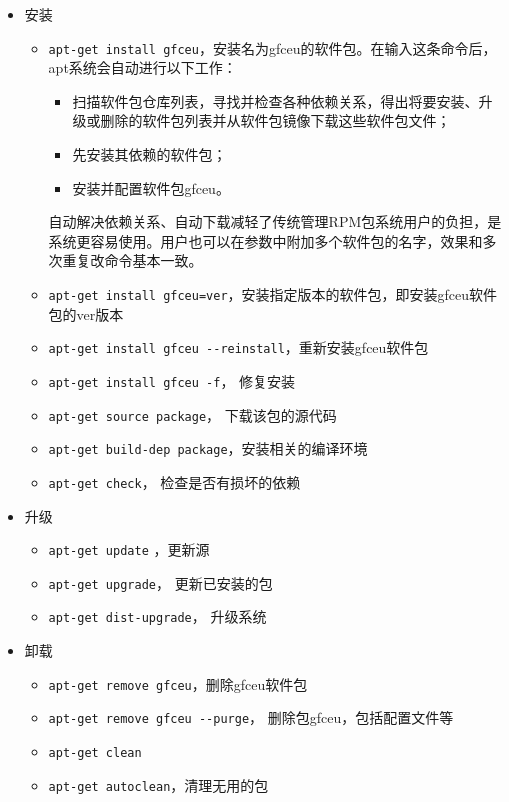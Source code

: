 \begin{itemize}
\item 安装
	\begin{itemize}
		\item \verb|apt-get install gfceu|，安装名为gfceu的软件包。在输入这条命令后，apt系统会自动进行以下工作：
		\begin{itemize}
			\item 扫描软件包仓库列表，寻找并检查各种依赖关系，得出将要安装、升级或删除的软件包列表并从软件包镜像下载这些软件包文件；
			\item 先安装其依赖的软件包；
			\item 安装并配置软件包gfceu。
		\end{itemize}
	自动解决依赖关系、自动下载减轻了传统管理RPM包系统用户的负担，是系统更容易使用。用户也可以在参数中附加多个软件包的名字，效果和多次重复改命令基本一致。
		\item \verb|apt-get install gfceu=ver|，安装指定版本的软件包，即安装gfceu软件包的ver版本
		\item \verb|apt-get install gfceu --reinstall|，重新安装gfceu软件包
		\item \verb|apt-get install gfceu -f|，  修复安装
		\item \verb|apt-get source package|， 下载该包的源代码
		\item \verb|apt-get build-dep package|，安装相关的编译环境
		\item \verb|apt-get check|， 检查是否有损坏的依赖
	\end{itemize}

\item 升级
	\begin{itemize}
		\item \verb|apt-get update| ，更新源
		\item \verb|apt-get upgrade|， 更新已安装的包
		\item \verb|apt-get dist-upgrade|， 升级系统
	\end{itemize}
	
\item 卸载
	\begin{itemize}
		\item \verb|apt-get remove gfceu|，删除gfceu软件包
		\item \verb|apt-get remove gfceu --purge|， 删除包gfceu，包括配置文件等
		\item \verb|apt-get clean|
		\item \verb|apt-get autoclean|，清理无用的包
	\end{itemize}
	

\end{itemize}

